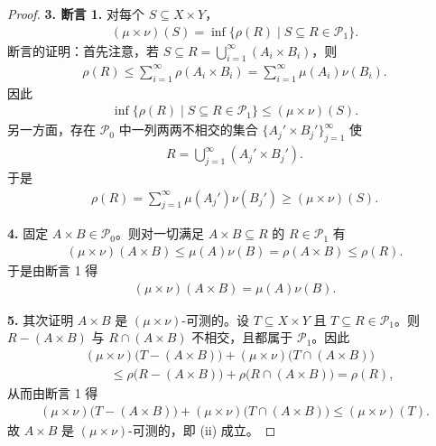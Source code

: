 \documentclass[../../main.tex]{subfiles}%
\begin{document}
\begin{proof}
\textbf{3. 断言 1.} 对每个 $S\subseteq X\times Y$，
\begin{align*}
(\mu\times\nu)(S)=\inf\{\rho(R)\mid S\subseteq R\in\mathcal{P}_1\}.
\end{align*}
断言的证明：首先注意，若 $S\subseteq R=\bigcup_{i=1}^{\infty}(A_i\times B_i)$，则
\begin{align*}
\rho(R)\leqslant\sum_{i=1}^{\infty}\rho(A_i\times B_i)=\sum_{i=1}^{\infty}\mu(A_i)\nu(B_i).
\end{align*}
因此
\begin{align*}
\inf\{\rho(R)\mid S\subseteq R\in\mathcal{P}_1\}\leqslant(\mu\times\nu)(S).
\end{align*}
另一方面，存在 $\mathcal{P}_0$ 中一列两两不相交的集合 $\{A_j'\times B_j'\}_{j=1}^{\infty}$ 使
\begin{align*}
R=\bigcup_{j=1}^{\infty}(A_j'\times B_j').
\end{align*}
于是
\begin{align*}
\rho(R)=\sum_{j=1}^{\infty}\mu(A_j')\nu(B_j')\geqslant(\mu\times\nu)(S).
\end{align*}

\textbf{4.} 固定 $A\times B\in\mathcal{P}_0$。则对一切满足 $A\times B\subseteq R$ 的 $R\in\mathcal{P}_1$ 有
\begin{align*}
(\mu\times\nu)(A\times B)\leqslant\mu(A)\nu(B)=\rho(A\times B)\leqslant\rho(R).
\end{align*}
于是由断言 1 得
\begin{align*}
(\mu\times\nu)(A\times B)=\mu(A)\nu(B).
\end{align*}

\textbf{5.} 其次证明 $A\times B$ 是 $(\mu\times\nu)$-可测的。设 $T\subseteq X\times Y$ 且 $T\subseteq R\in\mathcal{P}_1$。则 $R-(A\times B)$ 与 $R\cap(A\times B)$ 不相交，且都属于 $\mathcal{P}_1$。因此
\begin{align*}
&(\mu\times\nu)\bigl(T-(A\times B)\bigr)+(\mu\times\nu)\bigl(T\cap(A\times B)\bigr)\\
&\qquad\leqslant\rho\bigl(R-(A\times B)\bigr)+\rho\bigl(R\cap(A\times B)\bigr)=\rho(R),
\end{align*}
从而由断言 1 得
\begin{align*}
(\mu\times\nu)\bigl(T-(A\times B)\bigr)+(\mu\times\nu)\bigl(T\cap(A\times B)\bigr)\leqslant(\mu\times\nu)(T).
\end{align*}
故 $A\times B$ 是 $(\mu\times\nu)$-可测的，即 (ii) 成立。


\end{proof}
\end{document}
